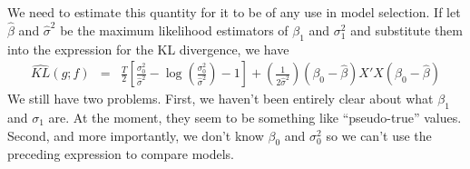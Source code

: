 \documentclass[12pt]{article}
\theoremstyle{definition}
\begin{document}
We need to estimate this quantity for it to be of any use in model selection. If let $\widehat{\beta}$ and $\widehat{\sigma}^2$ be the maximum likelihood estimators of $\beta_1$ and $\sigma_1^2$ and substitute them into the expression for the KL divergence, we have
\begin{eqnarray*}
	\widehat{KL}(g;f) &=& \frac{T}{2}\left[\frac{\sigma_0^2}{\widehat{\sigma}^2}  - \log\left(\frac{\sigma_0^2}{\widehat{\sigma}^2} \right) - 1\right] + \left(\frac{1}{2\widehat{\sigma}^2} \right)\left(\beta_0 - \widehat{\beta}\right)X'X\left(\beta_0 - \widehat{\beta}\right)
\end{eqnarray*}
We still have two problems. First, we haven't been entirely clear about what $\beta_1$ and $\sigma_1$ are. At the moment, they seem to be something like ``pseudo-true'' values. Second, and more importantly, we don't know $\beta_0$ and $\sigma_0^2$ so we can't use the preceding expression to compare models.
\end{document}
